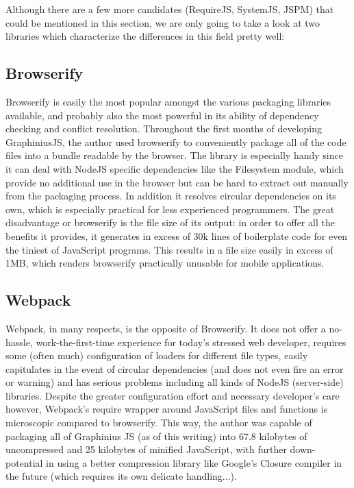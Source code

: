 	Although there are a few more candidates (RequireJS, SystemJS, JSPM) that could be mentioned in this section, we are only going to take a look at two libraries which characterize the differences in this field pretty well:
	
	
	\subsection{Browserify}
	\label{ssect:browserify}
	
	Browserify is easily the most popular amongst the various packaging libraries available, and probably also the most powerful in its ability of dependency checking and conflict resolution. Throughout the first months of developing GraphiniusJS, the author used browserify to conveniently package all of the code files into a bundle readable by the browser. The library is especially handy since it can deal with NodeJS specific dependencies like the Filesystem module, which provide no additional use in the browser but can be hard to extract out manually from the packaging process. In addition it resolves circular dependencies on its own, which is especially practical for less experienced programmers. The great disadvantage or browserify is the file size of its output: in order to offer all the benefits it provides, it generates in excess of 30k lines of boilerplate code for even the tiniest of JavaScript programs. This results in a file size easily in excess of 1MB, which renders browserify practically unusable for mobile applications.
	
	\subsection{Webpack}
	\label{ssect:webpack}

	Webpack, in many respects, is the opposite of Browserify. It does not offer a no-hassle, work-the-first-time experience for today's stressed web developer, requires some (often much) configuration of loaders for different file types, easily capitulates in the event of circular dependencies (and does not even fire an error or warning) and has serious problems including all kinds of NodeJS (server-side) libraries. Despite the greater configuration effort and necessary developer's care however, Webpack's require wrapper around JavaScript files and functions is microscopic compared to browserify. This way, the author was capable of packaging all of Graphinius JS (as of this writing) into 67.8 kilobytes of uncompressed and 25 kilobytes of minified JavaScript, with further down-potential in using a better compression library like Google's Closure compiler in the future (which requires its own delicate handling...).
	

